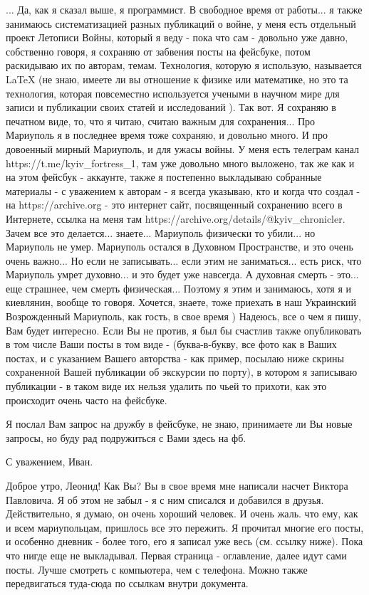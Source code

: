 ... Да, как я сказал выше, я программист. В свободное время от работы... я
также занимаюсь систематизацией разных публикаций о войне, у меня есть
отдельный проект Летописи Войны, который я веду - пока что сам - довольно уже
давно, собственно говоря, я сохраняю от забвения посты на фейсбуке, потом
раскидываю их по авторам, темам. Технология, которую я использую, называется
LaTeX (не знаю, имеете ли вы отношение к физике или математике, но это та
технология, которая повсеместно используется учеными в научном мире для записи
и публикации своих статей и исследований ). Так вот.  Я сохраняю в печатном
виде, то, что я читаю, считаю важным для сохранения...  Про Мариуполь я в
последнее время тоже сохраняю, и довольно много. И про довоенный мирный
Мариуполь, и для ужасы войны. У меня есть телеграм канал
https://t.me/kyiv_fortress_1, там уже довольно много выложено, так же как и на
этом фейсбук - аккаунте, также я постепенно выкладываю собранные  материалы - с
уважением к авторам - я всегда указываю, кто и когда что создал - на
https://archive.org - это интернет сайт, посвященный сохранению всего в
Интернете, ссылка на меня там https://archive.org/details/@kyiv_chronicler.
Зачем все это делается... знаете... Мариуполь физически то убили... но
Мариуполь не умер. Мариуполь остался в Духовном Пространстве, и это очень очень
важно... Но если не записывать... если этим не заниматься... есть риск, что
Мариуполь умрет духовно... и это будет уже навсегда. А духовная смерть - это...
еще страшнее, чем смерть физическая... Поэтому я этим и занимаюсь, хотя я и
киевлянин, вообще то говоря. Хочется, знаете, тоже приехать в наш Украинский
Возрожденный Мариуполь, как гость, в свое время ) Надеюсь, все о чем я пишу,
Вам будет интересно. Если Вы не против, я был бы счастлив также опубликовать в
том числе Ваши посты в том виде - (буква-в-букву, все фото как в Ваших постах,
и с указанием Вашего авторства - как пример, посылаю ниже скрины сохраненной
Вашей публикации об экскурсии по порту), в котором я записываю публикации - в
таком виде их нельзя удалить по чьей то прихоти, как это происходит очень часто
на фейсбуке.

Я послал Вам запрос на дружбу в фейсбуке, не знаю, принимаете ли Вы новые запросы, 
но буду рад подружиться с Вами здесь на фб.

С уважением, Иван.


Доброе утро, Леонид! Как Вы? Вы в свое время мне написали насчет Виктора
Павловича. Я об этом не забыл - я с ним списался и добавился в друзья.
Действительно, я думаю, он очень хороший человек. И очень жаль. что ему, как и
всем мариупольцам, пришлось все это пережить. Я прочитал многие его посты, и
особенно дневник - более того, его я записал уже весь (см. ссылку ниже).
Пока что нигде еще не выкладывал. Первая страница - оглавление, далее идут сами посты.
Лучше смотреть с компьютера, чем с телефона. 
Можно также передвигаться туда-сюда по ссылкам внутри документа.


